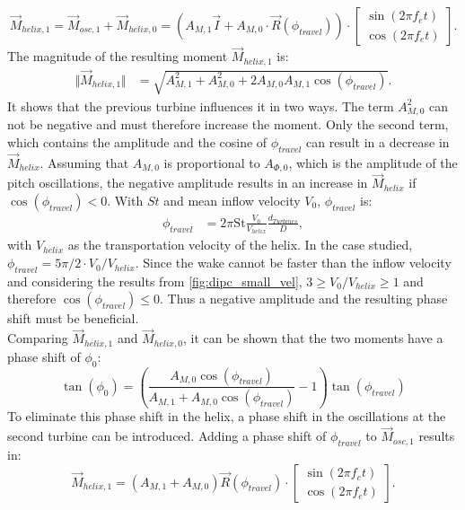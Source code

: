 \begin{equation}
	\vec{M}_{helix,1} = \vec{M}_{osc,1} + \vec{M}_{helix,0} = \left(A_{M,1} \vec{I} + A_{M,0} \cdot \vec{R}(\phi_{travel})\right) 
	\cdot 
	\begin{bmatrix}
	\sin(2\pi f_e t) \\
	\cos(2\pi f_e t)
	\end{bmatrix} .
\end{equation}
The magnitude of the resulting moment $\vec{M}_{helix,1}$ is:
\begin{align}
	\Vert\vec{M}_{helix,1}\Vert &= \sqrt{A_{M,1}^2 + A_{M,0}^2 + 2 A_{M,0} A_{M,1} \cos(\phi_{travel})}  \label{eq:helix_moment}.
\end{align}
It shows that the previous turbine influences it in two ways. The term $A_{M,0}^2$ can not be negative and must therefore increase the moment. Only the second term, which contains the amplitude and the cosine of $\phi_{travel}$ can result in a decrease in $\vec{M}_{helix}$. Assuming that $A_{M,0}$ is proportional to $A_{\Phi,0}$, which is the amplitude of the pitch oscillations, the negative amplitude results in an increase in $\vec{M}_{helix}$ if $\cos(\phi_{travel}) < 0$. With $St$ and mean inflow velocity $V_0$, $\phi_{travel}$ is:
\begin{align}
	\phi_{travel} & = 2 \pi \mathrm{St} \frac{V_0}{V_{helix}} \frac{d_{Turbines}}{D} \label{eq:phi_travel},
\end{align} 
with $V_{helix}$ as the transportation velocity of the helix. In the case studied, $\phi_{travel} = 5\pi/2 \cdot V_0 / V_{helix}$. Since the wake cannot be faster than the inflow velocity and considering the results from \autoref{fig:dipc_small_vel}, $ 3 \geq V_0/V_{helix} \geq 1$ and therefore $\cos(\phi_{travel})  \leq 0$. Thus a negative amplitude and the resulting phase shift must be beneficial.\\
Comparing $\vec{M}_{helix,1}$ and $\vec{M}_{helix,0}$, it can be shown that the two moments have a phase shift of $\phi_0$:
\begin{equation}
	\tan(\phi_0) = \left(\frac{A_{M,0} \cos(\phi_{travel})}{A_{M,1}+ A_{M,0} \cos(\phi_{travel})}-1\right) \tan(\phi_{travel}) \label{eq:phi_0}
\end{equation}
To eliminate this phase shift in the helix, a phase shift in the oscillations at the second turbine can be introduced. Adding a phase shift of $\phi_{travel}$ to $\vec{M}_{osc,1}$ results in:
\begin{equation}
	\vec{M}_{helix,1} = \left( A_{M,1} + A_{M,0} \right) \vec{R}(\phi_{travel}) \cdot
	\begin{bmatrix}
	\sin(2\pi f_e t) \\
	\cos(2\pi f_e t)
	\end{bmatrix} .
\end{equation}
